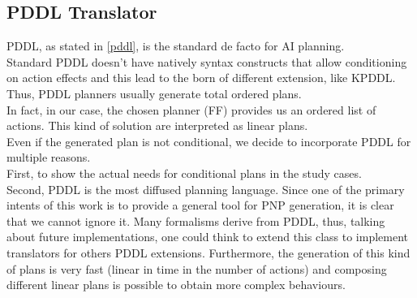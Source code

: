 \documentclass[pdftex,12pt,a4paper]{report}
\begin{document}
\subsection{PDDL Translator}
PDDL, as stated in \ref{pddl}, is the standard de facto for AI planning. \\
Standard PDDL doesn't have natively syntax constructs that allow conditioning on action effects and this lead to the born of different extension, like KPDDL.
Thus, PDDL planners usually generate total ordered plans.\\ 
In fact, in our case, the chosen planner (FF) provides us an ordered list of actions. This kind of solution are interpreted as linear plans.
\newline 
{}\\
\newline
Even if the generated plan is not conditional, we decide to incorporate PDDL for multiple reasons.\\ 
First, to show the actual needs for conditional plans in the study cases.\\ 
Second, PDDL is the most diffused planning language. Since one of the primary intents of this work is to provide a general tool for PNP generation, it is clear that we cannot ignore it. Many formalisms derive from PDDL, thus, talking about future implementations, one could think to extend this class to implement translators for others PDDL extensions.  
Furthermore, the generation of this kind of plans is very fast (linear in time in the number of actions) and composing different linear plans is possible to obtain more complex behaviours.
\end{document}
